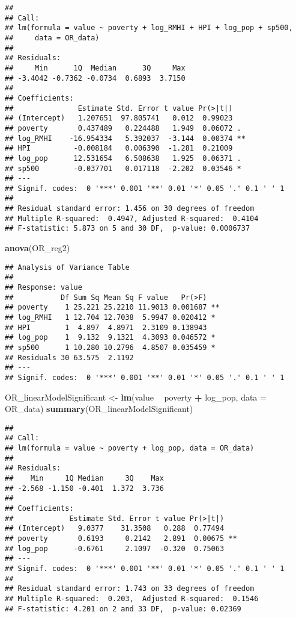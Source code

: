 \documentclass[
]{article}
\newenvironment{Shaded}{\begin{snugshade}}{\end{snugshade}}
\newcommand{\DataTypeTok}[1]{\textcolor[rgb]{0.13,0.29,0.53}{#1}}
\newcommand{\KeywordTok}[1]{\textcolor[rgb]{0.13,0.29,0.53}{\textbf{#1}}}
\newcommand{\NormalTok}[1]{#1}
\newcommand{\OperatorTok}[1]{\textcolor[rgb]{0.81,0.36,0.00}{\textbf{#1}}}
\newcommand{\StringTok}[1]{\textcolor[rgb]{0.31,0.60,0.02}{#1}}
\begin{document}
\begin{verbatim}
## 
## Call:
## lm(formula = value ~ poverty + log_RMHI + HPI + log_pop + sp500, 
##     data = OR_data)
## 
## Residuals:
##     Min      1Q  Median      3Q     Max 
## -3.4042 -0.7362 -0.0734  0.6893  3.7150 
## 
## Coefficients:
##               Estimate Std. Error t value Pr(>|t|)   
## (Intercept)   1.207651  97.805741   0.012  0.99023   
## poverty       0.437489   0.224488   1.949  0.06072 . 
## log_RMHI    -16.954334   5.392037  -3.144  0.00374 **
## HPI          -0.008184   0.006390  -1.281  0.21009   
## log_pop      12.531654   6.508638   1.925  0.06371 . 
## sp500        -0.037701   0.017118  -2.202  0.03546 * 
## ---
## Signif. codes:  0 '***' 0.001 '**' 0.01 '*' 0.05 '.' 0.1 ' ' 1
## 
## Residual standard error: 1.456 on 30 degrees of freedom
## Multiple R-squared:  0.4947, Adjusted R-squared:  0.4104 
## F-statistic: 5.873 on 5 and 30 DF,  p-value: 0.0006737
\end{verbatim}

\begin{Shaded}
\begin{Highlighting}[]
\KeywordTok{anova}\NormalTok{(OR_reg2)}
\end{Highlighting}
\end{Shaded}

\begin{verbatim}
## Analysis of Variance Table
## 
## Response: value
##           Df Sum Sq Mean Sq F value   Pr(>F)   
## poverty    1 25.221 25.2210 11.9013 0.001687 **
## log_RMHI   1 12.704 12.7038  5.9947 0.020412 * 
## HPI        1  4.897  4.8971  2.3109 0.138943   
## log_pop    1  9.132  9.1321  4.3093 0.046572 * 
## sp500      1 10.280 10.2796  4.8507 0.035459 * 
## Residuals 30 63.575  2.1192                    
## ---
## Signif. codes:  0 '***' 0.001 '**' 0.01 '*' 0.05 '.' 0.1 ' ' 1
\end{verbatim}

\begin{Shaded}
\begin{Highlighting}[]
\NormalTok{OR_linearModelSignificant <-}\StringTok{ }\KeywordTok{lm}\NormalTok{(value }\OperatorTok{~}\StringTok{ }\NormalTok{poverty }\OperatorTok{+}\StringTok{ }\NormalTok{log_pop, }\DataTypeTok{data =}\NormalTok{ OR_data)}
\KeywordTok{summary}\NormalTok{(OR_linearModelSignificant)}
\end{Highlighting}
\end{Shaded}

\begin{verbatim}
## 
## Call:
## lm(formula = value ~ poverty + log_pop, data = OR_data)
## 
## Residuals:
##    Min     1Q Median     3Q    Max 
## -2.568 -1.150 -0.401  1.372  3.736 
## 
## Coefficients:
##             Estimate Std. Error t value Pr(>|t|)   
## (Intercept)   9.0377    31.3508   0.288  0.77494   
## poverty       0.6193     0.2142   2.891  0.00675 **
## log_pop      -0.6761     2.1097  -0.320  0.75063   
## ---
## Signif. codes:  0 '***' 0.001 '**' 0.01 '*' 0.05 '.' 0.1 ' ' 1
## 
## Residual standard error: 1.743 on 33 degrees of freedom
## Multiple R-squared:  0.203,  Adjusted R-squared:  0.1546 
## F-statistic: 4.201 on 2 and 33 DF,  p-value: 0.02369
\end{verbatim}
\end{document}
